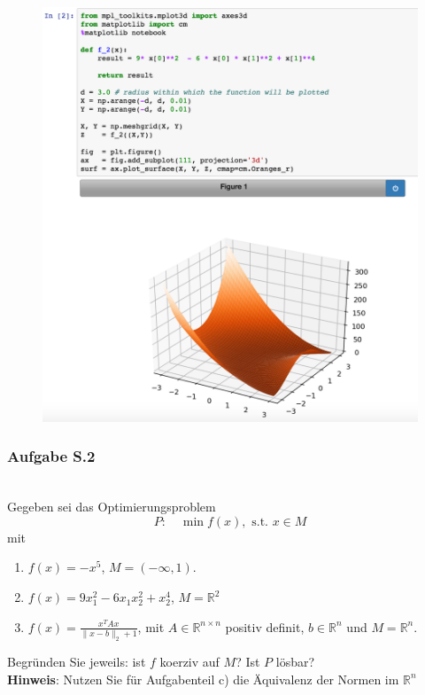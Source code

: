 \documentclass[12pt]{extreport} %
\newcommand{\R}{\mathbb{R}}
\theoremstyle{named}
\theoremstyle{nnamed}
\theoremstyle{itshape}
\theoremstyle{normal}
\begin{document}
\begin{figure}[h!]
  \centering
  \includegraphics[scale=0.35]{img/sui-ii}
  \label{fig:sub2}
\end{figure}

\newpage

\subsubsection{Aufgabe S.2} ~\\
Gegeben sei das Optimierungsproblem
$$ P: \quad \min f(x), \text{ s.t. } x \in M $$
mit
\begin{enumerate}
	\item $f(x) = - x^5$, $M =(- \infty, 1)$.
	\item $f(x) = 9 x_1^2 - 6 x_1 x_2^2 + x_2^4$, $M = \R^2$
	\item $f(x) = \frac{x^T A x}{\| x - b\|_2 + 1}$, mit $A \in \R^{n \times n}$ positiv definit, $b \in \R^n$ und $M = \R^n$.
\end{enumerate}
	Begründen Sie jeweils: ist $f$ koerziv auf $M$? Ist $P$ lösbar? ~\\
	\textbf{Hinweis}: Nutzen Sie für Aufgabenteil c) die Äquivalenz der Normen im $\R^n$ ~\bigskip
\end{document}
